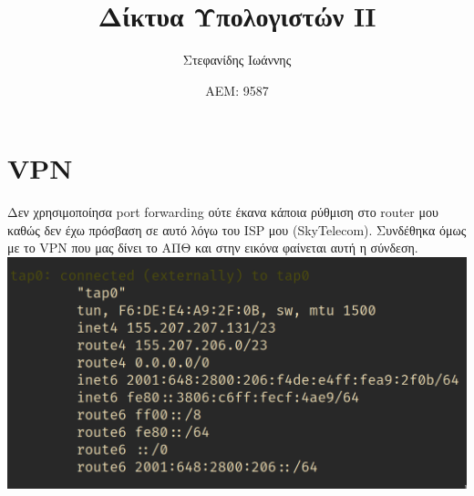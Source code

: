 \documentclass{article}
\author{Στεφανίδης Ιωάννης}
\title{Δίκτυα Υπολογιστών ΙΙ}
\date{ΑΕΜ: 9587}
\begin{document}
\maketitle

\section{VPN}

Δεν χρησιμοποίησα port forwarding ούτε έκανα κάποια ρύθμιση στο router μου καθώς
δεν έχω πρόσβαση σε αυτό λόγω του ISP μου (SkyTelecom).
Συνδέθηκα όμως με το VPN που μας δίνει το ΑΠΘ και στην εικόνα φαίνεται αυτή η
σύνδεση.\\

\centering
\includegraphics[width=\textwidth]{vpn}
\end{document}
